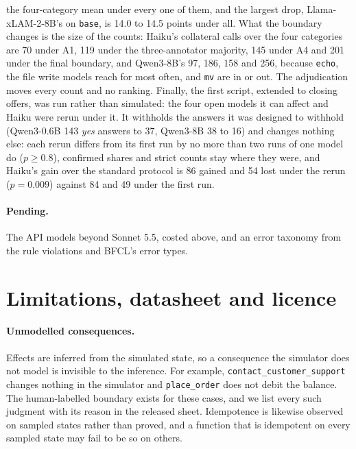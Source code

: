 \documentclass{article}
\newcommand{\cls}[1]{\texttt{#1}}
\begin{document}
the four-category mean under every one of them, and the largest drop, Llama-xLAM-2-8B's on \cls{base}, is 14.0 to 14.5
points under all. What the boundary changes is the size of the counts: Haiku's collateral calls over the four categories
are 70 under A1, 119 under the three-annotator majority, 145 under A4 and 201 under the final boundary, and Qwen3-8B's
97, 186, 158 and 256, because \cls{echo}, the file write models reach for most often, and \cls{mv} are in or out. The
adjudication moves every count and no ranking. Finally, the first script, extended to closing offers, was run rather
than simulated: the four open models it can affect and Haiku were rerun under it. It withholds the answers it was
designed to withhold (Qwen3-0.6B 143 \emph{yes} answers to 37, Qwen3-8B 38 to 16) and changes nothing else: each rerun
differs from its first run by no more than two runs of one model do ($p\ge0.8$), confirmed shares and strict counts
stay where they were, and Haiku's gain over the standard protocol is 86 gained and 54 lost under the rerun ($p=0.009$)
against 84 and 49 under the first run.

\paragraph{Pending.} The API models beyond Sonnet 5.5, costed above, and an error taxonomy from the rule violations and BFCL's error types.

\section{Limitations, datasheet and licence}
\label{sec:limitations}

\paragraph{Unmodelled consequences.} Effects are inferred from the simulated state, so a consequence the simulator does
not model is invisible to the inference. For example, \cls{contact\_customer\_support} changes nothing in the simulator
and \cls{place\_order} does not debit the balance. The human-labelled boundary exists for these cases, and we list every
such judgment with its reason in the released sheet. Idempotence is likewise observed on sampled states rather than
proved, and a function that is idempotent on every sampled state may fail to be so on others.
\end{document}

